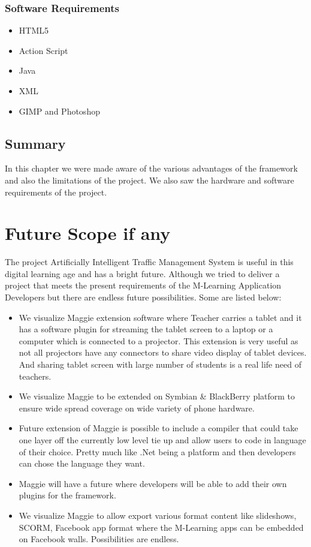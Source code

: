 \documentclass[openany,12pt]{report}
\begin{document}
\subsection{Software Requirements}
\begin{itemize}
\item{HTML5}
\item{Action Script}
\item{Java}
\item{XML}
\item{GIMP and Photoshop}
\end{itemize}

\section{Summary}
\hspace*{0.5in}In this chapter we were made aware of the various advantages of the framework and also the limitations of the project. We also saw the hardware and software requirements of the project.
\chapter {Future Scope if any}

\hspace{0.5in}The project Artificially Intelligent Traffic Management System is useful in this digital learning age and has a bright future. Although we tried to deliver a project that meets the present requirements of the M-Learning Application Developers but there are endless future possibilities. Some are listed below:
\\
\begin{itemize}
\item{We visualize Maggie extension software where Teacher carries a tablet and it has a software plugin for streaming the tablet screen to a laptop or a computer which is connected to a projector. This extension is very useful as not all projectors have any connectors to share video display of tablet devices. And sharing tablet screen with large number of students is a real life need of teachers.}
\item{We visualize Maggie to be extended on Symbian \& BlackBerry platform to ensure wide spread coverage on wide variety of phone hardware.}
\item{Future extension of Maggie is possible to include a compiler that could take one layer off the currently low level tie up and allow users to code in language of their choice. Pretty much like .Net being a platform and then developers can chose the language they want.}
\item{Maggie will have a future where developers will be able to add their own plugins for the framework.}
\item{We visualize Maggie to allow export various format content like slideshows, SCORM, Facebook app format where the M-Learning apps can be embedded on Facebook walls. Possibilities are endless.}
\end{itemize}
\end{document}

